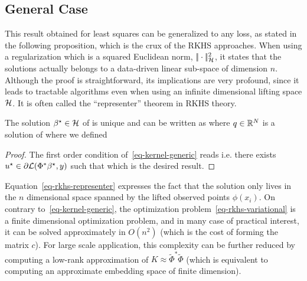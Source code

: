 \subsection{General Case}

This result obtained for least squares can be generalized to any loss, as stated in the following proposition, which is the crux of the RKHS approaches. When using a regularization which is a squared Euclidean norm, $|\!| \cdot |\!|_{\mathcal{H}}^2$, it states that the solutions actually belongs to a data-driven linear sub-space of dimension $n$. Although the proof is straightforward, its implications are very profound, since it leads to tractable algorithms even when using an infinite dimensional lifting space $\mathcal{H}$. It is often called the ``representer'' theorem in RKHS theory. 

\begin{prop}
	The solution $\beta^\star \in \mathcal{H}$ of
	is unique and can be written as
	where $q \in \mathbb{R}^N$ is a solution of
	where we defined 
\end{prop}

\begin{proof}
	The first order condition of~\eqref{eq-kernel-generic} reads
	i.e. there exists $u^\star \in \partial \mathcal{L}(\Phi^* \beta^\star,y)$ such that 
	which is the desired result. 
\end{proof} 

Equation~\eqref{eq-rkhs-representer} expresses the fact that the solution only lives in the $n$ dimensional space spanned by the lifted observed points $\phi(x_i)$.
%
On contrary to~\eqref{eq-kernel-generic}, the optimization problem~\eqref{eq-rkhs-variational} is a finite dimensional optimization problem, and in many case of practical interest, it can be solved approximately in $O(n^2)$ (which is the cost of forming the matrix $c$). For large scale application, this complexity can be further reduced by computing a low-rank approximation of $K \approx \tilde\Phi^* \tilde \Phi$ (which is equivalent to computing an approximate embedding space of finite dimension). 

